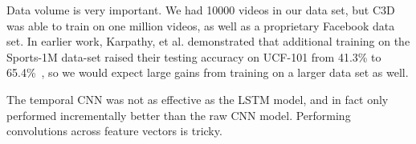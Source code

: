 Data volume is very important. We had 10000 videos in our data set, but C3D was able to train on one million videos, as well as a proprietary Facebook data set. In earlier work, Karpathy, et al. demonstrated that additional training on the Sports-1M data-set raised their testing accuracy on UCF-101 from 41.3\% to 65.4\%~\cite{cnnvid}, so we would expect large gains from training on a larger data set as well.

The temporal CNN was not as effective as the LSTM model, and in fact only performed incrementally better than the raw CNN model. Performing convolutions across feature vectors is tricky. 
